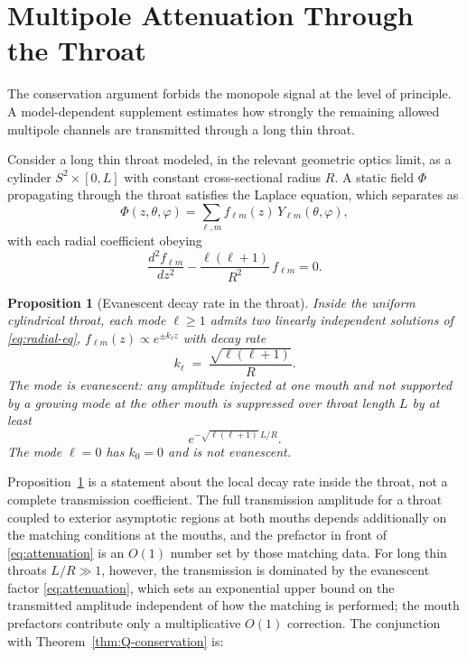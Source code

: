 \documentclass[aps,prd,onecolumn,nofootinbib,superscriptaddress]{revtex4-2}
\newtheorem{proposition}{Proposition}
\begin{document}
\section{Multipole Attenuation Through the Throat}
\label{sec:attenuation}

The conservation argument forbids the monopole signal at the level of principle. A model-dependent supplement estimates how strongly the remaining allowed multipole channels are transmitted through a long thin throat.

Consider a long thin throat modeled, in the relevant geometric optics limit, as a cylinder $S^2 \times [0,L]$ with constant cross-sectional radius $R$. A static field $\Phi$ propagating through the throat satisfies the Laplace equation, which separates as
\begin{equation}
\Phi(z,\theta,\varphi) = \sum_{\ell,m} f_{\ell m}(z)\, Y_{\ell m}(\theta,\varphi),
\end{equation}
with each radial coefficient obeying
\begin{equation}
\label{eq:radial-eq}
\frac{d^2 f_{\ell m}}{dz^2} - \frac{\ell(\ell+1)}{R^2}\, f_{\ell m} = 0.
\end{equation}

\begin{proposition}[Evanescent decay rate in the throat]
\label{prop:attenuation}
Inside the uniform cylindrical throat, each mode $\ell \ge 1$ admits two linearly independent solutions of \eqref{eq:radial-eq}, $f_{\ell m}(z) \propto e^{\pm k_\ell z}$ with decay rate
\begin{equation}
\label{eq:decay-rate}
k_\ell \;=\; \frac{\sqrt{\ell(\ell+1)}}{R}.
\end{equation}
The mode is evanescent: any amplitude injected at one mouth and not supported by a growing mode at the other mouth is suppressed over throat length $L$ by at least
\begin{equation}
\label{eq:attenuation}
e^{-\sqrt{\ell(\ell+1)}\,L/R}.
\end{equation}
The mode $\ell=0$ has $k_0 = 0$ and is not evanescent.
\end{proposition}

Proposition~\ref{prop:attenuation} is a statement about the local decay rate inside the throat, not a complete transmission coefficient. The full transmission amplitude for a throat coupled to exterior asymptotic regions at both mouths depends additionally on the matching conditions at the mouths, and the prefactor in front of \eqref{eq:attenuation} is an $O(1)$ number set by those matching data. For long thin throats $L/R \gg 1$, however, the transmission is dominated by the evanescent factor \eqref{eq:attenuation}, which sets an exponential upper bound on the transmitted amplitude independent of how the matching is performed; the mouth prefactors contribute only a multiplicative $O(1)$ correction. The conjunction with Theorem~\ref{thm:Q-conservation} is:
\end{document}
